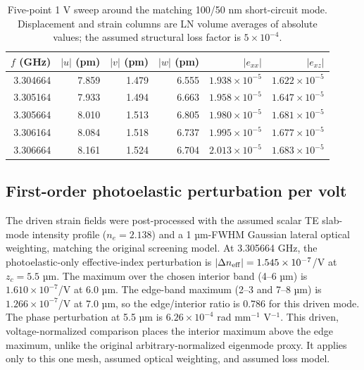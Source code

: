 \documentclass[10pt,twocolumn]{article}
\begin{document}
\begin{table}[t]\centering\small
\caption{Five-point 1 V sweep around the matching 100/50 nm short-circuit mode. Displacement and strain columns are LN volume averages of absolute values; the assumed structural loss factor is $5\times10^{-4}$.}
\label{tab:drive-fine}
\begin{tabular}{@{}rrrrrr@{}}\toprule
$f$ (GHz) & $|u|$ (pm) & $|v|$ (pm) & $|w|$ (pm) & $|e_{xx}|$ & $|e_{xz}|$\\\midrule
3.304664 & 7.859 & 1.479 & 6.555 & $1.938\times10^{-5}$ & $1.622\times10^{-5}$\\
3.305164 & 7.933 & 1.494 & 6.663 & $1.958\times10^{-5}$ & $1.647\times10^{-5}$\\
3.305664 & 8.010 & 1.513 & 6.805 & $1.980\times10^{-5}$ & $1.681\times10^{-5}$\\
3.306164 & 8.084 & 1.518 & 6.737 & $1.995\times10^{-5}$ & $1.677\times10^{-5}$\\
3.306664 & 8.161 & 1.524 & 6.704 & $2.013\times10^{-5}$ & $1.683\times10^{-5}$\\\bottomrule
\end{tabular}\end{table}

\subsection{First-order photoelastic perturbation per volt}
The driven strain fields were post-processed with the assumed scalar TE slab-mode intensity profile ($n_e=2.138$) and a 1 µm-FWHM Gaussian lateral optical weighting, matching the original screening model. At 3.305664 GHz, the photoelastic-only effective-index perturbation is $|\Delta n_{\rm eff}|=1.545\times10^{-7}$/V at $z_c=5.5$ µm. The maximum over the chosen interior band (4--6 µm) is $1.610\times10^{-7}$/V at 6.0 µm. The edge-band maximum (2--3 and 7--8 µm) is $1.266\times10^{-7}$/V at 7.0 µm, so the edge/interior ratio is 0.786 for this driven mode. The phase perturbation at 5.5 µm is $6.26\times10^{-4}$ rad mm$^{-1}$ V$^{-1}$. This driven, voltage-normalized comparison places the interior maximum above the edge maximum, unlike the original arbitrary-normalized eigenmode proxy. It applies only to this one mesh, assumed optical weighting, and assumed loss model.
\end{document}
